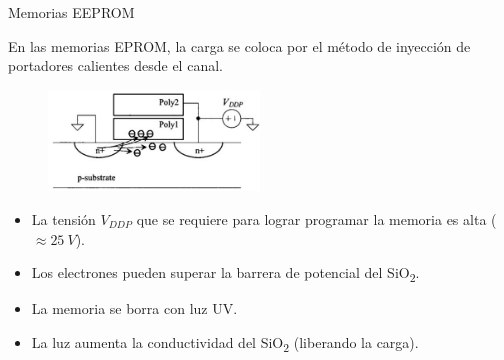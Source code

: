 \documentclass[aspectratio=169,t]{beamer}
\begin{document}
\begin{frame}{Memorias EEPROM}

En las memorias EPROM, la carga se coloca por el método de  inyección de portadores calientes desde el canal.

\begin{figure}
    \centering
    \includegraphics[width=0.5\textwidth]{figuras/eeprom.png}
\end{figure}

\begin{itemize}
    \item La tensión $V_{DDP}$ que  se requiere para lograr  programar la memoria es alta ($\approx 25\ V$).
    \item Los electrones pueden superar la barrera de potencial del SiO\textsubscript{2}.
    \item La memoria se borra con luz UV.
    \item La luz aumenta la conductividad del SiO\textsubscript{2} (liberando la carga).
\end{itemize}

\end{frame}
\end{document}
